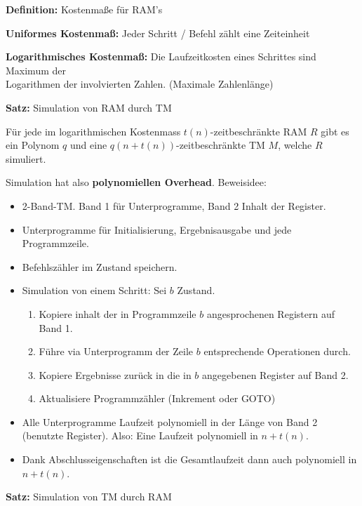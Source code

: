 \documentclass[a4paper,graphics,11pt]{article}
\begin{document}
\strut

\textbf{Definition:} Kostenmaße für RAM's

\textbf{Uniformes Kostenmaß:} Jeder Schritt / Befehl zählt eine Zeiteinheit

\textbf{Logarithmisches Kostenmaß:} Die Laufzeitkosten eines Schrittes sind Maximum der\\
Logarithmen der involvierten Zahlen. (Maximale Zahlenlänge)

\newpage

\textbf{Satz:} Simulation von RAM durch TM

Für jede im logarithmischen Kostenmass $t(n)$-zeitbeschränkte RAM $R$ gibt es ein Polynom $q$
und eine $q(n + t(n))$-zeitbeschränkte TM $M$, welche $R$ simuliert.

Simulation hat also \textbf{polynomiellen Overhead}. Beweisidee:
\begin{itemize}
    \item 2-Band-TM. Band 1 für Unterprogramme, Band 2 Inhalt der Register.
    \item Unterprogramme für Initialisierung, Ergebnisausgabe und jede Programmzeile.
    \item Befehlszähler im Zustand speichern.
    \item Simulation von einem Schritt: Sei $b$ Zustand.
        \begin{enumerate}
            \item Kopiere inhalt der in Programmzeile $b$ angesprochenen Registern auf Band 1.
            \item Führe via Unterprogramm der Zeile $b$ entsprechende Operationen durch.
            \item Kopiere Ergebnisse zurück in die in $b$ angegebenen Register auf Band 2.
            \item Aktualisiere Programmzähler (Inkrement oder GOTO)
        \end{enumerate}
    \item Alle Unterprogramme Laufzeit polynomiell in der Länge von Band 2 (benutzte
        Register). Also: Eine Laufzeit polynomiell in $n + t(n)$.
    \item Dank Abschlusseigenschaften ist die Gesamtlaufzeit dann
        auch polynomiell in $n+ t(n)$.
\end{itemize}

\strut

\textbf{Satz:} Simulation von TM durch RAM
\end{document}
